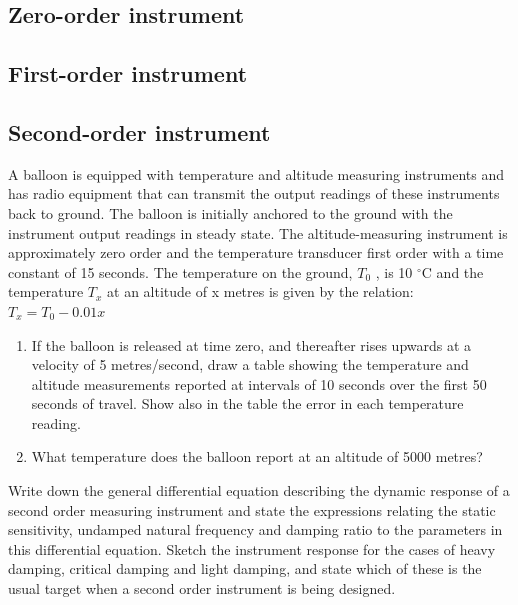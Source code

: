 \documentclass[a4paper,11pt]{book}
\begin{document}
\subsection*{Zero-order instrument}

\subsection*{First-order instrument}

\subsection*{Second-order instrument}


\begin{question}
A balloon is equipped with temperature and altitude measuring instruments and has radio
equipment that can transmit the output readings of these instruments back to ground. The
balloon is initially anchored to the ground with the instrument output readings in steady state.
The altitude-measuring instrument is approximately zero order and the temperature transducer
first order with a time constant of 15 seconds. The temperature on the ground, $T_0$ , is 10 $^{\circ}$C and the temperature $T_x$  at an altitude of x metres is
given by the relation: \\
$T_x = T_0 − 0.01x$

\begin{enumerate}
\item If the balloon is released at time zero, and thereafter rises upwards at a velocity of 5 metres/second, draw a table showing the temperature and altitude measurements reported
at intervals of 10 seconds over the first 50 seconds of travel. Show also in the table the
error in each temperature reading.
\item  What temperature does the balloon report at an altitude of 5000 metres?
\end{enumerate}

\examspace*{5em}

\end{question}
\begin{solution}


\end{solution}





\begin{question}
Write down the general differential equation describing the dynamic response of a second
order measuring instrument and state the expressions relating the static sensitivity, undamped
natural frequency and damping ratio to the parameters in this differential equation. Sketch
the instrument response for the cases of heavy damping, critical damping and light damping,
and state which of these is the usual target when a second order instrument is being designed.

\examspace*{40em}

\end{question}
\begin{solution}


\end{solution}
\end{document}
